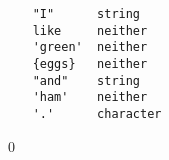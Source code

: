 
\begin{verbatim}
    "I"      string
    like     neither
    'green'  neither
    {eggs}   neither
    "and"    string
    'ham'    neither
    '.'      character
\end{verbatim}
\qed

    
